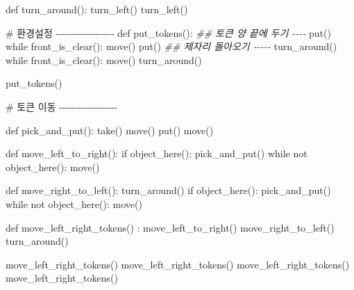 \documentclass[
  b5paperpaper,
  DIV=11,
  numbers=noendperiod]{scrreprt}
\newenvironment{Shaded}{\begin{snugshade}}{\end{snugshade}}
\newcommand{\CommentTok}[1]{\textcolor[rgb]{0.37,0.37,0.37}{#1}}
\newcommand{\ControlFlowTok}[1]{\textcolor[rgb]{0.00,0.23,0.31}{#1}}
\newcommand{\DocumentationTok}[1]{\textcolor[rgb]{0.37,0.37,0.37}{\textit{#1}}}
\newcommand{\FunctionTok}[1]{\textcolor[rgb]{0.28,0.35,0.67}{#1}}
\newcommand{\NormalTok}[1]{\textcolor[rgb]{0.00,0.23,0.31}{#1}}
\newcommand{\SpecialCharTok}[1]{\textcolor[rgb]{0.37,0.37,0.37}{#1}}
\begin{document}
\begin{Shaded}
\begin{Highlighting}[]
\NormalTok{def }\FunctionTok{turn\_around}\NormalTok{()}\SpecialCharTok{:}
    \FunctionTok{turn\_left}\NormalTok{()}
    \FunctionTok{turn\_left}\NormalTok{()}
    
\CommentTok{\# 환경설정 {-}{-}{-}{-}{-}{-}{-}{-}{-}{-}{-}{-}{-}{-}{-}{-}{-}{-}    }
\NormalTok{def }\FunctionTok{put\_tokens}\NormalTok{()}\SpecialCharTok{:}
    \DocumentationTok{\#\# 토큰 양 끝에 두기 {-}{-}{-}{-}}
    \FunctionTok{put}\NormalTok{()}
    \ControlFlowTok{while} \FunctionTok{front\_is\_clear}\NormalTok{()}\SpecialCharTok{:}
        \FunctionTok{move}\NormalTok{()}
    \FunctionTok{put}\NormalTok{()}
    \DocumentationTok{\#\# 제자리 돌아오기 {-}{-}{-}{-}{-}}
    \FunctionTok{turn\_around}\NormalTok{()}
    \ControlFlowTok{while} \FunctionTok{front\_is\_clear}\NormalTok{()}\SpecialCharTok{:}
        \FunctionTok{move}\NormalTok{()}
    \FunctionTok{turn\_around}\NormalTok{()}
    
\FunctionTok{put\_tokens}\NormalTok{()    }

\CommentTok{\# 토큰 이동 {-}{-}{-}{-}{-}{-}{-}{-}{-}{-}{-}{-}{-}{-}{-}{-}{-}{-}    }

\NormalTok{def }\FunctionTok{pick\_and\_put}\NormalTok{()}\SpecialCharTok{:}    
    \FunctionTok{take}\NormalTok{()}
    \FunctionTok{move}\NormalTok{()}
    \FunctionTok{put}\NormalTok{()}
    \FunctionTok{move}\NormalTok{()}

\NormalTok{def }\FunctionTok{move\_left\_to\_right}\NormalTok{()}\SpecialCharTok{:}
    \ControlFlowTok{if} \FunctionTok{object\_here}\NormalTok{()}\SpecialCharTok{:}
        \FunctionTok{pick\_and\_put}\NormalTok{()}
        \ControlFlowTok{while}\NormalTok{ not }\FunctionTok{object\_here}\NormalTok{()}\SpecialCharTok{:}
            \FunctionTok{move}\NormalTok{()}

\NormalTok{def }\FunctionTok{move\_right\_to\_left}\NormalTok{()}\SpecialCharTok{:}
    \FunctionTok{turn\_around}\NormalTok{()}
    \ControlFlowTok{if} \FunctionTok{object\_here}\NormalTok{()}\SpecialCharTok{:}
        \FunctionTok{pick\_and\_put}\NormalTok{()}
        \ControlFlowTok{while}\NormalTok{ not }\FunctionTok{object\_here}\NormalTok{()}\SpecialCharTok{:}
            \FunctionTok{move}\NormalTok{()}

\NormalTok{def }\FunctionTok{move\_left\_right\_tokens}\NormalTok{() }\SpecialCharTok{:}
    \FunctionTok{move\_left\_to\_right}\NormalTok{()}
    \FunctionTok{move\_right\_to\_left}\NormalTok{()           }
    \FunctionTok{turn\_around}\NormalTok{()}

  
\FunctionTok{move\_left\_right\_tokens}\NormalTok{()}
\FunctionTok{move\_left\_right\_tokens}\NormalTok{()}
\FunctionTok{move\_left\_right\_tokens}\NormalTok{()}
\FunctionTok{move\_left\_right\_tokens}\NormalTok{()}
\end{Highlighting}
\end{Shaded}
\end{document}
